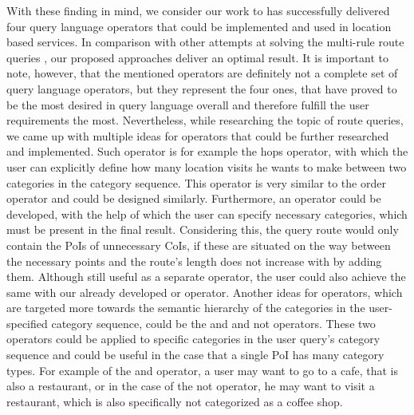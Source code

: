 With these finding in mind, we consider our work to has successfully delivered four query language operators that could be implemented and used in location based services. In comparison with other attempts at solving the multi-rule route queries \cite{multi}, our proposed approaches deliver an optimal result. It is important to note, however, that the mentioned operators are definitely not a complete set of query language operators, but they represent the four ones, that have proved to be the most desired in query language overall and therefore fulfill the user requirements the most. Nevertheless, while researching the topic of route queries, we came up with multiple ideas for operators that could be further researched and implemented. Such operator is for example the hops operator, with which the user can explicitly define how many location visits he wants to make between two categories in the category sequence. This operator is very similar to the order operator and could be designed similarly. Furthermore, an operator could be developed, with the help of which the user can specify necessary categories, which must be present in the final result. Considering this, the query route would only contain the PoIs of unnecessary CoIs, if these are situated on the way between the necessary points and the route's length does not increase with by adding them. Although still useful as a separate operator, the user could also achieve the same with our already developed or operator. \newline
Another ideas for operators, which are targeted more towards the semantic hierarchy of the categories in the user-specified category sequence, could be the and and not operators. These two operators could be applied to specific categories in the user query's category sequence and could be useful in the case that a single PoI has many category types. For example of the and operator, a user may want to go to a cafe, that is also a restaurant, or in the case of the not operator, he may want to visit a restaurant, which is also specifically not categorized as a coffee shop. \newline
